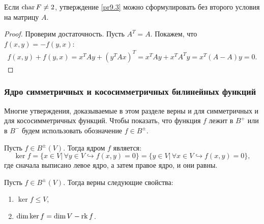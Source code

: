\begin{note}
    Если $\operatorname{char} F \neq 2$, утверждение \ref{pr9.3} можно сформулировать без второго условия на 
    матрицу $A$.
\end{note}

\begin{proof}
    Проверим достаточность. Пусть $A^T = A$. Покажем, что $f(x, y) = - f(y, x)$:
    \begin{gather*}
        f(x, y) + f(y, x) = x^T A y + (y^T A x)^T = x^T A y + x^T A^T y = x^T (A - A) y = 0.
    \end{gather*}
\end{proof}

\subsubsection{Ядро симметричных и кососимметричных билинейных функций}

\begin{agreement}
    Многие утверждения, доказываемые в этом разделе верны и для симметричных и для кососимметричных 
    функций. Чтобы показать, что функция $f$ лежит в $B^+$ или в $B^-$ будем использовать 
    обозначение $f \in B^{\pm}$.
\end{agreement}

\begin{definition}
    \label{def8.5}
    Пусть $f \in B^{\pm}(V)$. Тогда ядром $f$ является: 
    $$\ker f = \{x \in V \vert \, \forall y \in V \hookrightarrow f(x, y) = 0\} = 
    \{y \in V \vert \, \forall x \in V \hookrightarrow f(x, y) = 0\},$$ 
    где сначала выписано левое ядро, а затем правое ядро, и они равны.
\end{definition}

\begin{proposition}
    Пусть $f \in B^{\pm} (V)$. Тогда верны следующие свойства:
    \begin{enumerate}
        \item $\ker f \leq V$,
        \item $\dim \ker f = \dim V - \operatorname{rk} f$.
    \end{enumerate}
\end{proposition}

